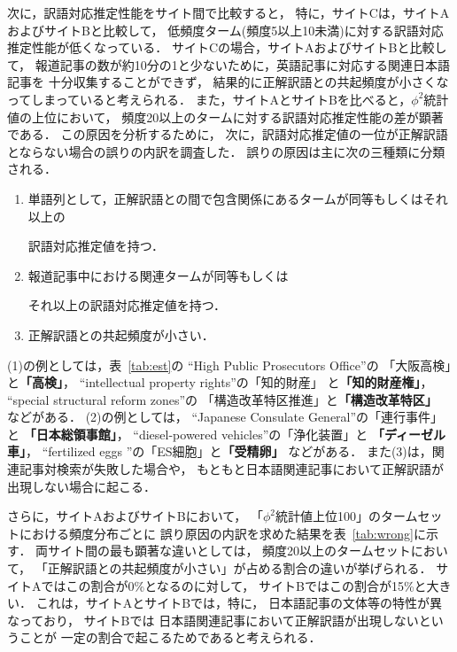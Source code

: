次に，訳語対応推定性能をサイト間で比較すると，
特に，サイトCは，サイトAおよびサイトBと比較して，
低頻度ターム(頻度5以上10未満)に対する訳語対応推定性能が低くなっている．
サイトCの場合，サイトAおよびサイトBと比較して，
報道記事の数が約10分の1と少ないために，英語記事に対応する関連日本語記事を
十分収集することができず，
結果的に正解訳語との共起頻度が小さくなってしまっていると考えられる．
また，サイトAとサイトBを比べると，$\phi^2$統計値の上位において，
頻度20以上のタームに対する訳語対応推定性能の差が顕著である．
この原因を分析するために，
次に，訳語対応推定値の一位が正解訳語とならない場合の誤りの内訳を調査した．
誤りの原因は主に次の三種類に分類される．
\begin{enumerate}
\item[(1)] 単語列として，正解訳語との間で包含関係にあるタームが同等もしくはそれ以上の
      
      訳語対応推定値を持つ．
      
\item[(2)] 報道記事中における関連タームが同等もしくは
      
      それ以上の訳語対応推定値を持つ．
\item[(3)] 正解訳語との共起頻度が小さい．
      
\end{enumerate}
(1)の例としては，表~\ref{tab:est}の
``High Public Prosecutors Office''の
「大阪高検」と{\bf 「高検」}，
``intellectual property rights''の「知的財産」
   と{\bf 「知的財産権」}，
``special structural reform zones''の
「構造改革特区推進」と{\bf 「構造改革特区」}
などがある．
(2)の例としては，
``Japanese Consulate General''の「連行事件」と
   {\bf 「日本総領事館」}，
``diesel-powered vehicles''の「浄化装置」と
{\bf 「ディーゼル車」}，
``fertilized eggs ''の「ES細胞」と{\bf 「受精卵」}
などがある．
また(3)は，関連記事対検索が失敗した場合や，
もともと日本語関連記事において正解訳語が出現しない場合に起こる．

さらに，サイトAおよびサイトBにおいて，
「$\phi^2$統計値上位100」のタームセットにおける頻度分布ごとに
誤り原因の内訳を求めた結果を表~\ref{tab:wrong}に示す．
両サイト間の最も顕著な違いとしては，
頻度20以上のタームセットにおいて，
「正解訳語との共起頻度が小さい」が占める割合の違いが挙げられる．
サイトAではこの割合が0\%となるのに対して，
サイトBではこの割合が15\%と大きい．
これは，サイトAとサイトBでは，特に，
日本語記事の文体等の特性が異なっており，
サイトBでは
日本語関連記事において正解訳語が出現しないということが
一定の割合で起こるためであると考えられる．




